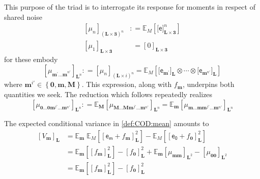 \documentclass[preprint,12pt]{elsarticle}
\newcommand*{\M}[1]{\ensuremath{#1}\xspace}
\newcommand*{\x}{\times}
\newcommand*{\mi}[1]{\mathbf{#1}}
\newcommand*{\rv}[1]{\mathsf{#1}}
\newcommand*{\te}[2][]{\left\lbrack{#2}\right\rbrack_{#1}}
\newcommand*{\tte}[2][]{\lbrack{#2}\rbrack_{#1}}
\newcommand*{\deq}{\M{\mathrel{\mathop:}=}}
\newcommand*{\ev}[3][]{\mathbb{E}_{#3}^{#1}\!\left\lbrack{#2}\right\rbrack}
\newcommand*{\evt}[3][]{\mathbb{E}_{#3}^{#1}\!#2}
\newcommand*{\set}[1]{\M{\left\lbrace{#1}\right\rbrace}}
\begin{document}
    This purpose of the triad is to interrogate its response for moments in respect of shared noise
    \begin{equation}\label{def:SPEst:mu}
        \begin{aligned}
            \te[(\mi{L\x 3})^{n}]{\mu_{n}} &\deq \ev{\tte[\mi{L\x 3}]{\rv{e}}^{n}}{M} \\
            \te[\mi{L\x 3}]{\mu_{1}} &\phantom{:}= \te[\mi{L\x 3}]{0}
        \end{aligned}
    \end{equation}
    for these embody
    \begin{equation*}
        \te[\mi{L}^{n}]{\mu_{\mi{m^{\prime}\ldots m}^{n\prime}}} \deq \te[(\mi{L\x}i)^{n}]{\mu_{n}} = \ev{\tte[\mi{L}]{\rv{e}_{\mi{m}^{\prime}}}\otimes\cdots\otimes\tte[\mi{L}]{\rv{e}_{\mi{m}^{n\prime}}}}{M}
    \end{equation*}
    where $\mi{m}^{i\prime} \in \set{\mi{0},\mi{m},\mi{M}}$. This expression, along with $f_{\mi{m}}$, underpins both quantities we seek. The reduction which follows repeatedly realizes
    \begin{equation}\label{eq:SPEstimates:reduction}
        \te[\mi{L}^{n}]{\mu_{\mi{0\ldots 0}\mi{m}^{j\prime}\mi{\ldots m}^{n\prime}}} \deq 
        \evt{\te[\mi{L}^{n}]{\mu_{\mi{M\ldots M}\mi{m}^{j\prime}\mi{\ldots m}^{n\prime}}}}{\mi{M}} = 
        \evt{\te[\mi{L}^{n}]{\mu_{\mi{m\ldots m}\mi{m}^{j\prime}\mi{\ldots m}^{n\prime}}}}{\mi{m}}
    \end{equation}

    The expected conditional variance in \cref{def:COD:mean} amounts to
    \begin{equation}
        \begin{aligned}
            \te[\mi{L}]{V_{\mi{m}}} 
            &= \evt{\;\ev{\te[\mi{L}]{\rv{e_m} + f_{\mi{m}}}^{2}}{M}}{\mi{m}}
            - \ev{\te[\mi{L}]{\rv{e_0} + f_{\mi{0}}}^{2}}{M} \\
            &= \ev{\te[\mi{L}]{f_{\mi{m}}}^{2}}{\mi{m}} - \te[\mi{L}]{f_{\mi{0}}}^{2} + 
            \evt{\te[\mi{L}^2]{\mu_{\mi{mm}}}}{\mi{m}} - \te[\mi{L}^2]{\mu_{\mi{00}}} \\
            &= \ev{\te[\mi{L}]{f_{\mi{m}}}^{2}}{\mi{m}} - \te[\mi{L}]{f_{\mi{0}}}^{2}
        \end{aligned}
    \end{equation}
\end{document}
